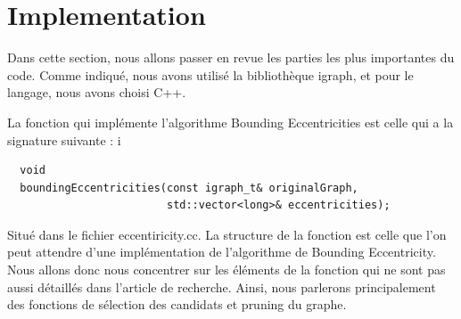 \documentclass[11pt]{article}
\begin{document}
\section{Implementation}
Dans cette section, nous allons passer en revue les parties les plus importantes
du code. Comme indiqué, nous avons utilisé la bibliothèque igraph, et pour le
langage, nous avons choisi C++.\par La fonction qui implémente l'algorithme
Bounding Eccentricities est celle qui a la signature suivante :
i\begin{verbatim}
  void
  boundingEccentricities(const igraph_t& originalGraph,
                         std::vector<long>& eccentricities);
\end{verbatim}
Situé dans le fichier eccentiricity.cc. La structure de la fonction est celle
que l'on peut attendre d'une implémentation de l'algorithme de Bounding
Eccentricity. Nous allons donc nous concentrer sur les éléments de la fonction
qui ne sont pas aussi détaillés dans l'article de recherche. Ainsi, nous
parlerons principalement des fonctions de sélection des candidats et pruning
du graphe. \par
\end{document}

